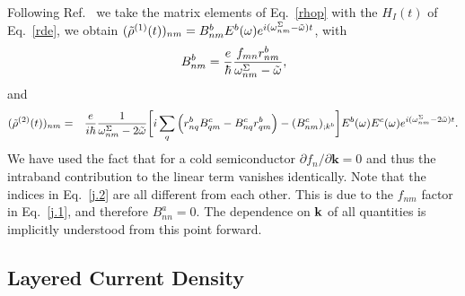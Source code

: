 \documentclass[floatfix,prb,aps,superscriptaddress,11pt,preprint,letterpaper]{revtex4}
\begin{document}
Following Ref.~ we take the
matrix elements of Eq.~\eqref{rhop} with the $H_{I}(t)$ of 
Eq.~\eqref{rde}, we obtain 
$(\tilde{\rho}^{(1)}(t))_{nm}=B_{nm}^{b}E^{b}(\omega)e^{i(\omega^\Sigma_{nm}-\tilde\omega)t}$,
with 
\begin{equation}\label{j.1}
B_{nm}^{b}=\frac{e}{\hbar }\frac{f_{mn}r_{nm}^{b}}{\omega^\Sigma_{nm}-\tilde\omega},
\end{equation}
and 
\begin{eqnarray}\label{j.2}
(\tilde{\rho}^{(2)}(t))_{nm} &=&\frac{e}{i\hbar }\frac{1}{\omega^\Sigma_{nm}-2\tilde\omega}\bigg[
i\sum_{q }\Big(r_{nq }^{b}B_{q m}^{c}-B_{nq}^{c}r_{q m}^{b}
\Big)  
-(B_{nm}^{c})_{;k^{b}}\bigg]E^{b}(\omega)E^{c}(\omega)e^{i(\omega^\Sigma_{nm}-2\tilde\omega)t}
.
\end{eqnarray}
We have used the fact that for a cold semiconductor $\partial
f_{n}/\partial \mathbf{k}=0$ and thus the intraband contribution to the linear
term vanishes identically. 
Note that the indices in Eq.~\eqref{j.2} are all different from each
other. This is due to the $f_{nm}$ factor in Eq.~\eqref{j.1}, 
and therefore $B^a_{nn}=0$. The dependence on $\mathbf{k}$ 
of all quantities is implicitly understood from 
this point forward.

\subsection{Layered Current Density}\label{cd}

\end{document}
